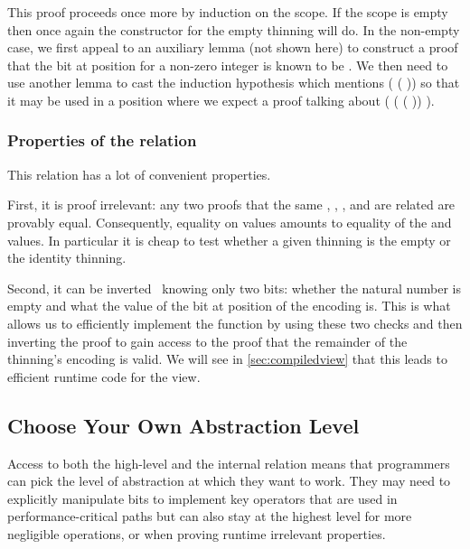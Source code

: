 

This proof proceeds once more by induction on the scope.
%
If the scope is empty then once again the constructor for the empty thinning will do.
%
In the non-empty case, we first appeal to an auxiliary lemma (not shown here) to
construct  a proof that the bit at position  for a
non-zero  integer is known to be .
%
We then need to use another lemma to cast the induction hypothesis which mentions
( ( )) so that it may be
used in a position where we expect a proof talking about
( ( ( \IdrisData{:<} ))
 ).

\subsubsection{Properties of the  relation}

This relation has a lot of convenient properties.

First, it is proof irrelevant: any two proofs that the same
, , , and  are
related are provably equal.
%
Consequently, equality on  values amounts to equality of
the  and  values. In particular
it is cheap to test whether a given thinning is the empty or the
identity thinning.

Second, it can be inverted~\cite{DBLP:conf/types/CornesT95} knowing only two bits:
whether the natural number is empty and what the value of the bit at position
 of the encoding is.
%
This is what allows us to efficiently implement the  function
by using
these two checks and then inverting the  proof to gain access
to the proof that the remainder of the thinning's encoding is valid.
%
We will see in \cref{sec:compiledview} that this leads to efficient runtime code for the view.

\subsection{Choose Your Own Abstraction Level}

Access to both the high-level  and the internal 
relation means that programmers can pick the level of abstraction at which they
want to work.
%
They may need to explicitly manipulate bits to implement key operators that are
used in performance-critical paths but can also stay at the highest level for
more negligible operations, or when proving runtime irrelevant properties.

